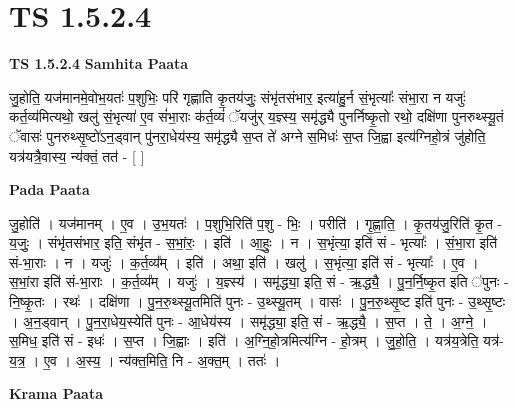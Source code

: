 \documentclass[17pt]{extarticle}
\begin{document}
\section*{ TS 1.5.2.4 }

\textbf{TS 1.5.2.4 } \newline
\textbf{Samhita Paata} \newline

जु॒होति॒ यज॑मानमे॒वोभ॒यतः॑ प॒शुभिः॒ परि॑ गृह्णाति कृ॒तय॑जुः॒ संभृ॑तसंभार॒ इत्या॑हु॒र्न सं॒भृत्याः᳚ संभा॒रा न यजुः॑ कर्त॒व्य॑मित्यथो॒ खलु॑ सं॒भृत्या॑ ए॒व सं॑भा॒राः क॑र्त॒व्यं॑ ॅयजु॑र् य॒ज्ञ्स्य॒ समृ॑द्ध्यै पुनर्निष्कृ॒तो रथो॒ दक्षि॑णा पुनरुथ्स्यू॒तं ॅवासः॑ पुनरुथ्सृ॒ष्टो॑ऽन॒ड्वान् पु॑नरा॒धेय॑स्य॒ समृ॑द्ध्यै स॒प्त ते॑ अग्ने स॒मिधः॑ स॒प्त जि॒ह्वा इत्य॑ग्निहो॒त्रं जु॑होति॒ यत्र॑यत्रै॒वास्य॒ न्य॑क्तं॒ तत॑ - [ ] \newline

\textbf{Pada Paata} \newline

जु॒होति॑ । यज॑मानम् । ए॒व । उ॒भ॒यतः॑ । प॒शुभि॒रिति॑ प॒शु - भिः॒ । परीति॑ । गृ॒ह्णा॒ति॒ । कृ॒तय॑जु॒रिति॑ कृ॒त - य॒जुः॒ । संभृ॑तसंभार॒ इति॒ संभृ॑त - स॒भां॒रः॒ । इति॑ । आ॒हुः॒ । न । स॒भृंत्या॒ इति॑ सं - भृत्याः᳚ । सं॒भा॒रा इति॑ सं-भा॒राः । न । यजुः॑ । क॒र्त॒व्य᳚म् । इति॑ । अथा॒ इति॑ । खलु॑ । स॒भृंत्या॒ इति॑ सं - भृत्याः᳚ । ए॒व । स॒भां॒रा इति॑ सं-भा॒राः । क॒र्त॒व्य᳚म् । यजुः॑ । य॒ज्ञ्स्य॑ । समृ॑द्ध्या॒ इति॒ सं - ऋ॒द्ध्यै॒ । पु॒न॒र्नि॒ष्कृ॒त इति ॑पुनः - नि॒ष्कृ॒तः । रथः॑ । दक्षि॑णा । पु॒न॒रु॒थ्स्यू॒तमिति॑ पुनः - उ॒थ्स्यू॒तम् । वासः॑ । पु॒न॒रु॒थ्सृ॒ष्ट इति॑ पुनः - उ॒थ्सृ॒ष्टः । अ॒न॒ड्वान् । पु॒न॒रा॒धेय॒स्येति॑ पुनः - आ॒धेय॑स्य । समृ॑द्ध्या॒ इति॒ सं - ऋ॒द्ध्यै॒ । स॒प्त । ते॒ । अ॒ग्ने॒ । स॒मिध॒ इति॑ सं - इधः॑ । स॒प्त । जि॒ह्वाः । इति॑ । अ॒ग्नि॒हो॒त्रमित्य॑ग्नि - हो॒त्रम् । जु॒हो॒ति॒ । यत्र॑य॒त्रेति॒ यत्र॑-य॒त्र॒ । ए॒व । अ॒स्य॒ । न्य॑क्त॒मिति॒ नि - अ॒क्त॒म् । ततः॑ ।  \newline


\textbf{Krama Paata} \newline
\end{document}
